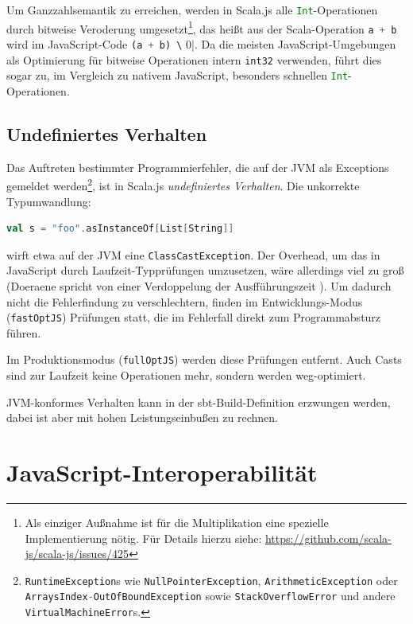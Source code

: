 \documentclass[a4paper, 12pt, hidelinks, listof=totoc, listoftables=totoc, bibliography=totoc]{scrreprt}
\newcommand{\code}[1]{\lstinline[language=Scala, style=inline]|#1|}
\newcommand{\scala}[1]{\lstinline[language=Scala, style=inline]|#1|}
\newcommand{\js}[1]{\lstinline[language=JavaScript, style=inline]|#1|}
\begin{document}
Um Ganzzahlsemantik zu erreichen, werden in Scala.js alle \scala{Int}-Operationen durch bitweise Veroderung umgesetzt\footnote{Als einziger Außnahme ist für die Multiplikation eine spezielle Implementierung nötig. Für Details hierzu siehe: \url{https://github.com/scala-js/scala-js/issues/425}}, das heißt aus der Scala-Operation \scala{a + b} wird im JavaScript-Code \js{(a + b) \| 0}. Da die meisten JavaScript-Umgebungen als Optimierung für bitweise Operationen
intern \code{int32} verwenden, führt dies sogar zu, im Vergleich zu nativem JavaScript, besonders schnellen \code{Int}-Operationen. \cite[Folie~16~ff., Min.~10]{doeraene2015.SSP}


\subsection{Undefiniertes Verhalten}\label{subsec:undefined-behavior}

Das Auftreten bestimmter Programmierfehler, die auf der JVM als Exceptions gemeldet werden\footnote{\scala{RuntimeException}s wie \scala{NullPointerException}, \scala{ArithmeticException} oder \scala{ArraysIndex-OutOfBoundException} sowie \scala{StackOverflowError} und andere \scala{VirtualMachineError}s.},
ist in Scala.js \emph{undefiniertes Verhalten}. Die unkorrekte Typumwandlung:

\begin{lstlisting}[language=Scala, style=snippet]
val s = "foo".asInstanceOf[List[String]]
\end{lstlisting}

wirft etwa auf der JVM eine \scala{ClassCastException}. Der Overhead, um das in JavaScript durch Laufzeit-Typprüfungen umzusetzen, wäre allerdings viel zu groß (Doeraene spricht von einer Verdoppelung der Ausfführungszeit \cite[Folie 23 ff., Min. 15]{doeraene2015.SSP}). Um dadurch nicht die Fehlerfindung zu verschlechtern, finden im Entwicklungs-Modus (\code{fastOptJS}) Prüfungen statt, die im Fehlerfall direkt zum Programmabsturz führen.

Im Produktionsmodus (\code{fullOptJS}) werden diese Prüfungen entfernt. Auch Casts sind zur Laufzeit keine Operationen mehr, sondern werden weg-optimiert.

JVM-konformes Verhalten kann in der sbt-Build-Definition erzwungen werden, dabei ist aber mit hohen Leistungseinbußen zu rechnen. \cite[Folie 23 ff., Min. 15]{doeraene2015.SSP}\cite{scalajs.DSS}



\section{JavaScript-Interoperabilität}
\end{document}
